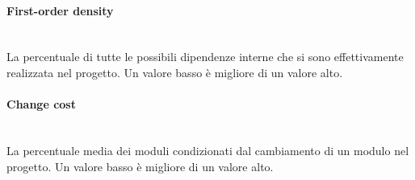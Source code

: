 			\paragraph{First-order density}\mbox{} \\

			La percentuale di tutte le possibili dipendenze interne che si sono effettivamente realizzata nel progetto. Un valore basso è migliore di un valore alto.


			\paragraph{Change cost}\mbox{} \\

			La percentuale media dei moduli condizionati dal cambiamento di un modulo nel progetto. Un valore basso è migliore di un valore alto.